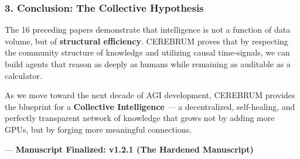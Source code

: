 \subsubsection{3. Conclusion: The Collective Hypothesis}
The 16 preceding papers demonstrate that intel\-ligence is not a function of data volume, but of \textbf{structural efficiency}. CEREBRUM proves that by respecting the community structure of knowledge and utilizing causal time-signals, we can build agents that reason as deeply as humans while remaining as auditable as a calculator. 

As we move toward the next decade of AGI development, CEREBRUM provides the blueprint for a \textbf{Collective Intell\-igence} — a decen\-tralized, self-healing, and perfectly transparent network of knowledge that grows not by adding more GPUs, but by forging more meaningful connections.

---
\textbf{Manuscript Finalized: v1.2.1 (The Hardened Manuscript)}
